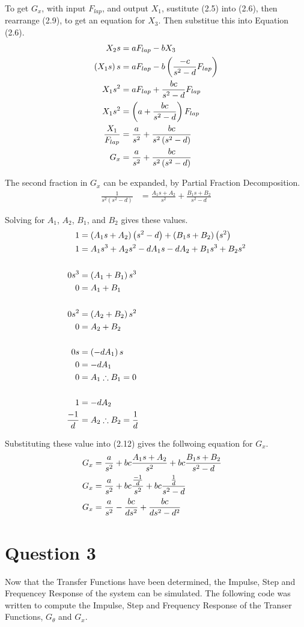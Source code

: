 \documentclass[a4paper,10pt,reqno]{article}
\numberwithin{equation}{section}
\begin{document}
\newpage
\noindent
To get $G_x$, with input $F_{lap}$, and output $X_1$, sustitute (2.5) into (2.6), then rearrange (2.9), to get an equation for $X_3$. Then substitue this into Equation (2.6).
\begin{align}
X_{2} s &= a F_{lap} - b X_{3}\cr
\left( X_{1} s \right) s &= a F_{lap} - b \left( \frac{-c}{s^2 - d} F_{lap} \right)\cr
X_{1} s^2 &= a F_{lap} + \frac{bc}{s^2 - d} F_{lap} \cr
X_{1} s^2 &= \left( a + \frac{bc}{s^2 - d} \right) F_{lap} \cr
\frac{X_{1}}{F_{lap}} &= \frac{a}{s^2} + \frac{bc}{s^2 \left( s^2 - d \right)}\\
G_{x} &= \frac{a}{s^2} + \frac{bc}{s^2 \left( s^2 - d \right)}
\end{align}

\noindent
The second fraction in $G_x$ can be expanded, by Partial Fraction Decomposition.
\begin{align}
\frac{1}{s^2 \left( s^2 - d \right)} &= \frac{A_1 s + A_2}{s^2} + \frac{B_1 s + B_2}{s^2 - d}
\end{align}

\noindent
Solving for $A_1$, $A_2$, $B_1$, and $B_2$ gives these values.
\begin{align}
1 &= \left( A_1 s + A_2 \right) \left(s^2 - d\right) + \left( B_1 s + B_2 \right) \left(s^2 \right) \cr
1 &= A_1 s^3 + A_2 s^2 - d A_1 s - d A_2 + B_1 s^3 + B_2 s^2\\
\cr
0 s^3 &= \left( A_1 + B_1 \right) s^3 \cr
0 &= A_1 + B_1 \\
\cr
0 s^2 &= \left( A_2 + B_2 \right) s^2 \cr
0 &= A_2 + B_2 \\
\cr
0 s &= \left( -d A_1 \right) s\cr
0 &= -d A_1 \cr
0 &= A_1 \therefore B_1 = 0 \\
\cr
1 &= -d A_2 \cr
\frac{-1}{d} &= A_2 \therefore B_2 = \frac{1}{d}
\end{align}

\noindent
Substituting these value into (2.12) gives the follwoing equation for $G_x$.
\begin{align}
G_{x} &= \frac{a}{s^2} + bc \frac{A_1 s + A_2}{s^2} + bc \frac{B_1 s + B_2}{s^2 - d}\cr
G_{x} &= \frac{a}{s^2} + bc \frac{\frac{-1}{d}}{s^2} + bc \frac{\frac{1}{d}}{s^2 - d}\cr
G_{x} &= \frac{a}{s^2} - \frac{bc}{d s^2} + \frac{bc}{ds^2 - d^2}
\end{align}

\newpage
\section{Question 3}
Now that the Transfer Functions have been determined, the Impulse, Step and Frequencey Response of the system can be simulated.
The following code was written to compute the Impulse, Step and Frequency Response of the Transer Functions, 
$G_{\theta}$ and $G_x$.
\end{document}
